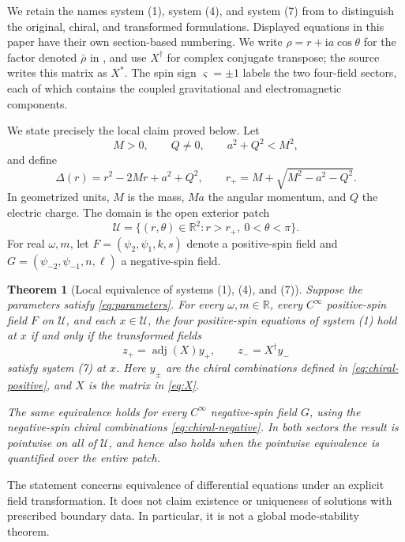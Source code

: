 \documentclass[11pt,a4paper]{article}
\numberwithin{equation}{section}
\newtheorem{theorem}{Theorem}[section]
\theoremstyle{definition}
\theoremstyle{remark}
\newcommand{\R}{\mathbb R}
\newcommand{\I}{\mathrm i}
\newcommand{\adj}{\operatorname{adj}}
\newcommand{\Uext}{\mathcal U}
\begin{document}
We retain the names system (1), system (4), and system (7)
from \cite{Hintz2026} to distinguish the original, chiral, and
transformed formulations.  Displayed equations in this paper have their
own section-based numbering.  We write \(\rho=r+\I a\cos\theta\) for
the factor denoted \(\bar\rho\) in \cite{Hintz2026}, and use
\(X^\dagger\) for complex conjugate transpose; the source writes this
matrix as \(X^*\).  The spin sign \(\varsigma=\pm1\) labels the two
four-field sectors, each of which contains the coupled gravitational and
electromagnetic components.

We state precisely the local claim proved below.  Let
\begin{equation}
 M>0,\qquad Q\neq0,\qquad a^2+Q^2<M^2,
\label{eq:parameters}
\end{equation}
and define
\begin{equation}
 \Delta(r)=r^2-2Mr+a^2+Q^2,\qquad
 r_+=M+\sqrt{M^2-a^2-Q^2}.
\label{eq:delta}
\end{equation}
In geometrized units, \(M\) is the mass, \(Ma\) the angular momentum,
and \(Q\) the electric charge.
The domain is the open exterior patch
\begin{equation}
 \Uext=\{(r,\theta)\in\R^2:r>r_+,\ 0<\theta<\pi\}.
\label{eq:domain}
\end{equation}
For real \(\omega,m\), let \(F=(\psi_2,\psi_1,k,s)\) denote a
positive-spin field and \(G=(\psi_{-2},\psi_{-1},n,\ell)\) a
negative-spin field.

\begin{theorem}[Local equivalence of systems (1), (4), and (7)]
\label{thm:main}
Suppose the parameters satisfy \eqref{eq:parameters}.  For every
\(\omega,m\in\R\), every \(C^\infty\) positive-spin field \(F\) on
\(\Uext\), and each \(x\in\Uext\), the four positive-spin equations of
system (1) hold at \(x\) if and only if the transformed fields
\[
 z_+=\adj(X)y_+,\qquad z_-=X^\dagger y_-
\]
satisfy system (7) at \(x\).  Here \(y_\pm\) are the chiral combinations
defined in \eqref{eq:chiral-positive}, and \(X\) is the matrix in
\eqref{eq:X}.

The same equivalence holds for every \(C^\infty\) negative-spin field
\(G\), using the negative-spin chiral combinations
\eqref{eq:chiral-negative}.  In both sectors the result is pointwise on
all of \(\Uext\), and hence also holds when the pointwise equivalence is
quantified over the entire patch.
\end{theorem}

The statement concerns equivalence of differential equations under an
explicit field transformation.  It does not claim existence or uniqueness
of solutions with prescribed boundary data.  In particular, it is not a
global mode-stability theorem.
\end{document}
